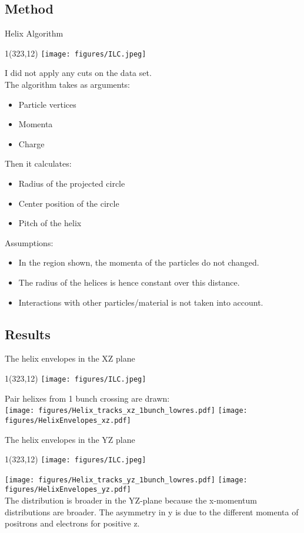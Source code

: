 \documentclass[xcolor={dvipsnames}]{beamer}
\newcommand{\ilclogo}{
  \setlength{\TPHorizModule}{1pt}
  \setlength{\TPVertModule}{1pt}
  \begin{textblock}{1}(323,12)
   \texttt{[image: figures/ILC.jpeg]}
  \end{textblock}
}
\begin{document}
\subsection{Method}
\begin{frame}{Helix Algorithm}
\ilclogo
I did not apply any cuts on the data set.\\
The algorithm takes as arguments:
\begin{itemize}
 \item Particle vertices
 \item Momenta
 \item Charge
\end{itemize}

Then it calculates:
\begin{itemize}
 \item Radius of the projected circle
 \item Center position of the circle
 \item Pitch of the helix
\end{itemize}

Assumptions:
\begin{itemize}
 \item In the region shown, the momenta of the particles do not changed.
 \item The radius of the helices is hence constant over this distance.
 \item Interactions with other particles/material is not taken into account.
\end{itemize}
\end{frame}

\subsection{Results}
\begin{frame}{The helix envelopes in the XZ plane}
\ilclogo
Pair helixes from 1 bunch crossing are drawn:\\
\vspace*{0.2cm}
\texttt{[image: figures/Helix\_tracks\_xz\_1bunch\_lowres.pdf]}
\texttt{[image: figures/HelixEnvelopes\_xz.pdf]}
\end{frame}
\begin{frame}{The helix envelopes in the YZ plane}
\ilclogo
\texttt{[image: figures/Helix\_tracks\_yz\_1bunch\_lowres.pdf]}
\texttt{[image: figures/HelixEnvelopes\_yz.pdf]}\\
The distribution is broader in the YZ-plane because the x-momentum distributions are broader.
The asymmetry in y is due to the different momenta of positrons and electrons for positive z.
\end{frame}
\end{document}
